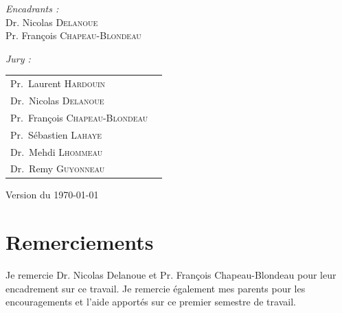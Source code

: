 \documentclass[12pt,a4paper]{report}
\newcommand\frontmatter{
    \cleardoublepage
    \pagenumbering{roman}
}
\newcommand\mainmatter{
    \cleardoublepage
    \pagenumbering{arabic}
}
\begin{document}
\begin{titlepage}
\begin{center}
\begin{minipage}{0.4\textwidth}
\begin{flushright}
          \emph{Encadrants :}\\
          Dr. Nicolas \textsc{Delanoue}\\
          Pr. François \textsc{Chapeau-Blondeau}\\
          \end{flushright}
      \end{minipage}
      \vfill
      \large
      \emph{Jury :}
      \begin{tabular}{lc}
          Pr.~Laurent \textsc{Hardouin}\\
          Dr.~Nicolas \textsc{Delanoue}\\
          Pr.~François \textsc{Chapeau-Blondeau}\\
          Pr.~Sébastien \textsc{Lahaye}\\
          Dr.~Mehdi  \textsc{Lhommeau}\\
          Dr.~Remy  \textsc{Guyonneau}\\
      \end{tabular}

      \vspace{2cm}
      
      {\large Version  du \today}
    \end{center}
\end{titlepage}

\frontmatter

\section*{Remerciements}
Je remercie Dr. Nicolas Delanoue et Pr. François Chapeau-Blondeau pour leur encadrement sur ce travail. Je remercie également mes parents pour les encouragements et l'aide apportés sur ce premier semestre de travail.

\pagebreak
\tableofcontents

\pagebreak
\listoffigures

\mainmatter








\begin{appendix}




\end{appendix}
% 
\end{document}
